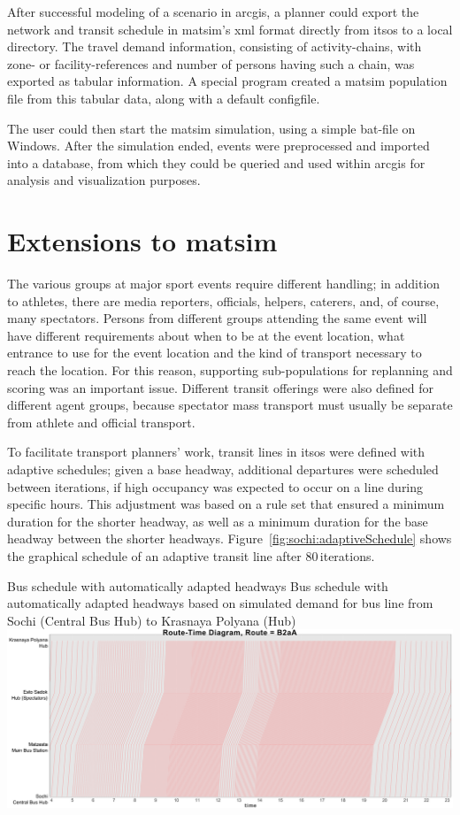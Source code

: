 After successful modeling of a scenario in \gls{arcgis}, a planner could export
the network and transit schedule in \gls{matsim}'s \gls{xml} format directly from \gls{itsos} to a
local directory. The travel demand information, consisting of activity-chains,
with zone- or facility-references and number of persons having such a
chain, was exported as tabular information. A special program created a \gls{matsim}
population file from this tabular data, along with a default \gls{configfile}.

The user could then start the \gls{matsim} simulation, using a simple bat-file
on Windows. After the simulation ended,  events were preprocessed and
imported into a database, from which they could be queried and used within \gls{arcgis}
for analysis and visualization purposes.

\section{Extensions to \protect\gls{matsim}}
The various groups at major sport events require different handling;
in addition to athletes, there are media reporters, officials,
helpers, caterers, and, of course, many spectators. Persons from different
groups attending the same event will have different requirements about when
to be at the event location, what entrance to use for the event
location and the kind of transport necessary to reach the location. For this reason,
supporting sub-populations for \gls{replanning} and scoring was an important issue.
Different transit offerings were also defined for different agent groups,
because spectator mass transport must usually be separate from
athlete and official transport.

To facilitate transport planners' work, transit lines in
\gls{itsos} were defined with adaptive schedules; given a base headway,
additional departures were scheduled between iterations, if high
occupancy was expected to occur on a line during specific hours. This adjustment was based
on a rule set that ensured a minimum duration for the shorter headway, as well
as a minimum duration for the base headway between the shorter headways.
Figure~\ref{fig:sochi:adaptiveSchedule} shows the graphical schedule of an
adaptive transit line after 80\,iterations.

\createfigure%
{Bus schedule with automatically adapted headways}%
{Bus schedule with automatically adapted headways based on simulated demand for
bus line from Sochi (Central Bus Hub) to Krasnaya Polyana (Hub)}%
{\label{fig:sochi:adaptiveSchedule}}%
{\includegraphics[width=1.\textwidth,angle=0]{./scenarios/figures/sochi_adaptiveSchedule.pdf}}%
{}

